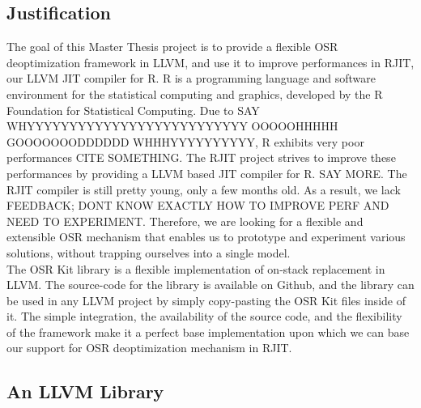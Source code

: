 \subsection{Justification}
The goal of this Master Thesis project is to provide a flexible OSR deoptimization framework in LLVM, and use it to improve performances in RJIT, our LLVM JIT compiler for R.
R is a programming language and software environment for the statistical computing and graphics, developed by the R Foundation for Statistical Computing\cite{RURL}.
Due to SAY WHYYYYYYYYYYYYYYYYYYYYYYYYYY OOOOOHHHHH GOOOOOOODDDDDD WHHHYYYYYYYYYY, R exhibits very poor performances CITE SOMETHING.
The RJIT project strives to improve these performances by providing a LLVM based JIT compiler for R. SAY MORE.
The RJIT compiler is still pretty young, only a few months old.
As a result, we lack FEEDBACK; DONT KNOW EXACTLY HOW TO IMPROVE PERF AND NEED TO EXPERIMENT.
Therefore, we are looking for a flexible and extensible OSR mechanism that enables us to prototype and experiment various solutions, without trapping ourselves into a single model.\\

The OSR Kit library\cite{OSRKit} is a flexible implementation of on-stack replacement in LLVM.
The source-code for the library is available on Github\cite{OSRKitGit}, and the library can be used in any LLVM project by simply copy-pasting the OSR Kit files inside of it.
The simple integration, the availability of the source code, and the flexibility of the framework make it a perfect base implementation upon which we can base our support for OSR deoptimization mechanism in RJIT.



\subsection{An LLVM Library}

